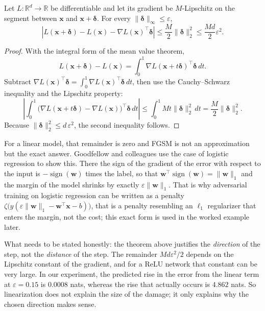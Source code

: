 \begin{teorema}
Let $L:\mathbb{R}^{d}\to\mathbb{R}$ be differentiable and let its gradient be
$M$-Lipschitz on the segment between $\mathbf{x}$ and $\mathbf{x}+\boldsymbol{\delta}$.
For every $\lVert\boldsymbol{\delta}\rVert_\infty\le\varepsilon$,
\[
  \left|L(\mathbf{x}+\boldsymbol{\delta})-L(\mathbf{x})
  -\nabla L(\mathbf{x})^{\top}\boldsymbol{\delta}\right|
  \le\frac{M}{2}\lVert\boldsymbol{\delta}\rVert_2^2
  \le\frac{Md}{2}\varepsilon^2 .
\]
\end{teorema}

\begin{proof}
With the integral form of the mean value theorem,
\[
  L(\mathbf{x}+\boldsymbol{\delta})-L(\mathbf{x})
  =\int_0^1\nabla L(\mathbf{x}+t\boldsymbol{\delta})^{\top}\boldsymbol{\delta}\,dt .
\]
Subtract $\nabla L(\mathbf{x})^{\top}\boldsymbol{\delta}
=\int_0^1\nabla L(\mathbf{x})^{\top}\boldsymbol{\delta}\,dt$, then use the
Cauchy--Schwarz inequality and the Lipschitz property:
\[
  \left|\int_0^1\bigl(\nabla L(\mathbf{x}+t\boldsymbol{\delta})
  -\nabla L(\mathbf{x})\bigr)^{\top}\boldsymbol{\delta}\,dt\right|
  \le\int_0^1 Mt\lVert\boldsymbol{\delta}\rVert_2^2\,dt
  =\frac{M}{2}\lVert\boldsymbol{\delta}\rVert_2^2 .
\]
Because $\lVert\boldsymbol{\delta}\rVert_2^2\le d\,\varepsilon^2$, the second
inequality follows.
\end{proof}

For a linear model, that remainder is zero and FGSM is not an approximation but the
exact answer. Goodfellow and colleagues use the case of logistic regression to show
this. There the sign of the gradient of the error with respect to the input is
$-\operatorname{sign}(\mathbf{w})$ times the label, so that
$\mathbf{w}^{\top}\operatorname{sign}(\mathbf{w})=\lVert\mathbf{w}\rVert_1$ and the margin
of the model shrinks by exactly $\varepsilon\lVert\mathbf{w}\rVert_1$. That is why
adversarial training on logistic regression can be written as a penalty
$\zeta\bigl(y(\varepsilon\lVert\mathbf{w}\rVert_1-\mathbf{w}^{\top}\mathbf{x}-b)\bigr)$,
that is a penalty resembling an $\ell_1$ regularizer that enters the margin, not the
cost; this exact form is used in the worked example later.

What needs to be stated honestly: the theorem above justifies the \emph{direction} of
the step, not the \emph{distance} of the step. The remainder $Md\varepsilon^{2}/2$
depends on the Lipschitz constant of the gradient, and for a ReLU network that
constant can be very large. In our experiment, the predicted rise in the error from
the linear term at $\varepsilon=0.15$ is $0.0008$ nats, whereas the rise that
actually occurs is $4.862$ nats. So linearization does not explain the size of the
damage; it only explains why the chosen direction makes sense.

